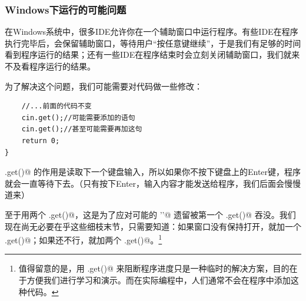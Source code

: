 \subsubsection*{Windows下运行的可能问题}
在Windows系统中，很多IDE允许你在一个辅助窗口中运行程序。有些IDE在程序执行完毕后，会保留辅助窗口，等待用户``按任意键继续''，于是我们有足够的时间看到程序运行的结果；还有一些IDE在程序结束时会立刻关闭辅助窗口，我们就来不及看程序运行的结果。\par
为了解决这个问题，我们可能需要对代码做一些修改：
\begin{lstlisting}
    //...前面的代码不变
    cin.get();//可能需要添加的语句
    cin.get();//甚至可能需要再加这句
    return 0;
}
\end{lstlisting}
\lstinline@cin.get()@ 的作用是读取下一个键盘输入，所以如果你不按下键盘上的Enter键，程序就会一直等待下去。（只有按下Enter，输入内容才能发送给程序，我们后面会慢慢道来）\par
至于用两个 \lstinline@cin.get()@，这是为了应对可能的 \lstinline@'\n'@ 遗留被第一个 \lstinline@cin.get()@ 吞没。我们现在尚无必要在乎这些细枝末节，只需要知道：如果窗口没有保持打开，就加一个 \lstinline@cin.get()@；如果还不行，就加两个 \lstinline@cin.get()@。\footnote{值得留意的是，用 \lstinline@cin.get()@ 来阻断程序进度只是一种临时的解决方案，目的在于方便我们进行学习和演示。而在实际编程中，人们通常不会在程序中添加这种代码。}\par
